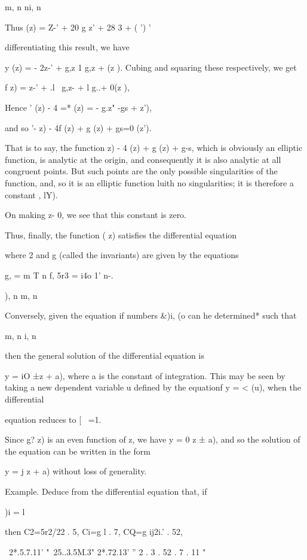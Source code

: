 {m, n ni, n

Thus (z) = Z-' + 20 g z' + 28 3 + ( ') '

differentiating this result, we have

 y (z) = - 2z-' + g,z 1 g,z + (z ). Cubing and squaring these
respectively, we get

f z) = z-' + .l~ g,z- + l g..+ 0(z ),

Hence ' (z) - 4 =* (z) = - g.z" -gs + z'),

and so '- z) - 4f (z) + g (z) + gs=0 (z').

That is to say, the function z) - 4 (z) + g (z) + g-s, which is
obviously an elliptic function, is analytic at the origin, and
consequently it is also analytic at all congruent points. But such
points are the only possible singularities of the function, and, so it
is an elliptic function luith no singularities; it is therefore a
constant , lY).

On making z- 0, we see that this constant is zero.

%
%

Thus, finally, the function ( z) satisfies the differential equation

where 2 and g (called the invariants) are given by the equations

g, = m T n f, 5r3 = i4o 1' n-.

), n m, n

Conversely, given the equation if numbers \&)i, (o can he determined*
such that

m, n i, n

then the general solution of the differential equation is

y = iO ±z + a), where a is the constant of integration. This may be
seen by taking a new dependent variable u defined by the equationf y =
< (u), when the differential

equation reduces to [ \ =1.

Since g? z) is an even function of z, we have y = 0 z ± a), and so the
solution of the equation can be written in the form

y = j z + a) without loss of generality.

Example. Deduce from the differential equation that, if

)i = l

then C2=5r2/22 . 5, Ci=g l . 7, CQ=g ij2i.' . 52,

 ~2*.5.7.11' "~25..3.5M.3" 2*.72.13' '' 2 . 3 . 52 . 7 . 11 "

}

